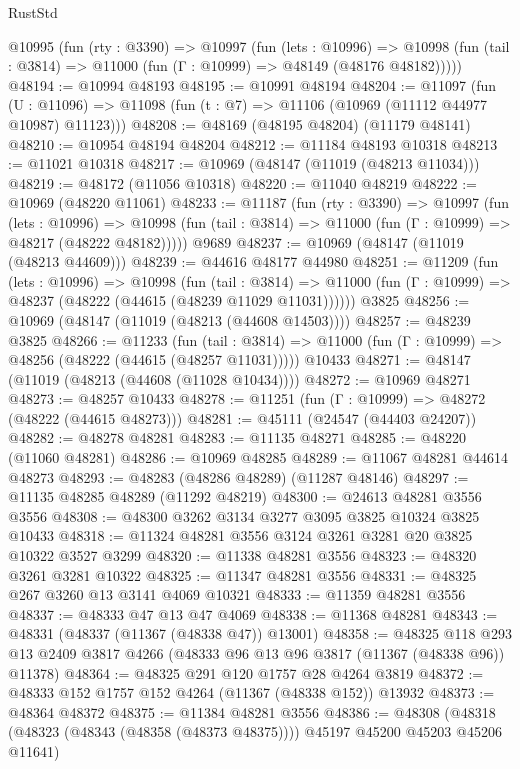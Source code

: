 \begin{lexlean}{RustStd}
\begin{coremodule}
  @10995
    (fun (rty : @3390) =>
    @10997
      (fun (lets : @10996) =>
      @10998 (fun (tail : @3814) => @11000 (fun (Γ : @10999) => @48149 (@48176 @48182)))))
@48194 := @10994 @48193
@48195 := @10991 @48194
@48204 := @11097
    (fun (U : @11096) => @11098 (fun (t : @7) => @11106 (@10969 (@11112 @44977 @10987) @11123)))
@48208 := @48169 (@48195 @48204) (@11179 @48141)
@48210 := @10954 @48194 @48204
@48212 := @11184 @48193 @10318
@48213 := @11021 @10318
@48217 := @10969 (@48147 (@11019 (@48213 @11034)))
@48219 := @48172 (@11056 @10318)
@48220 := @11040 @48219
@48222 := @10969 (@48220 @11061)
@48233 := @11187
    (fun (rty : @3390) =>
    @10997
      (fun (lets : @10996) =>
      @10998 (fun (tail : @3814) => @11000 (fun (Γ : @10999) => @48217 (@48222 @48182)))))
    @9689
@48237 := @10969 (@48147 (@11019 (@48213 @44609)))
@48239 := @44616 @48177 @44980
@48251 := @11209
    (fun (lets : @10996) =>
    @10998
      (fun (tail : @3814) =>
      @11000 (fun (Γ : @10999) => @48237 (@48222 (@44615 (@48239 @11029 @11031))))))
    @3825
@48256 := @10969 (@48147 (@11019 (@48213 (@44608 @14503))))
@48257 := @48239 @3825
@48266 := @11233
    (fun (tail : @3814) => @11000 (fun (Γ : @10999) => @48256 (@48222 (@44615 (@48257 @11031)))))
    @10433
@48271 := @48147 (@11019 (@48213 (@44608 (@11028 @10434))))
@48272 := @10969 @48271
@48273 := @48257 @10433
@48278 := @11251 (fun (Γ : @10999) => @48272 (@48222 (@44615 @48273)))
@48281 := @45111 (@24547 (@44403 @24207))
@48282 := @48278 @48281
@48283 := @11135 @48271
@48285 := @48220 (@11060 @48281)
@48286 := @10969 @48285
@48289 := @11067 @48281 @44614 @48273
@48293 := @48283 (@48286 @48289) (@11287 @48146)
@48297 := @11135 @48285 @48289 (@11292 @48219)
@48300 := @24613 @48281 @3556 @3556
@48308 := @48300 @3262 @3134 @3277 @3095 @3825 @10324 @3825 @10433
@48318 := @11324 @48281 @3556 @3124 @3261 @3281 @20 @3825 @10322 @3527 @3299
@48320 := @11338 @48281 @3556
@48323 := @48320 @3261 @3281 @10322
@48325 := @11347 @48281 @3556
@48331 := @48325 @267 @3260 @13 @3141 @4069 @10321
@48333 := @11359 @48281 @3556
@48337 := @48333 @47 @13 @47 @4069
@48338 := @11368 @48281
@48343 := @48331 (@48337 (@11367 (@48338 @47)) @13001)
@48358 := @48325
    @118
    @293
    @13
    @2409
    @3817
    @4266
    (@48333 @96 @13 @96 @3817 (@11367 (@48338 @96)) @11378)
@48364 := @48325 @291 @120 @1757 @28 @4264 @3819
@48372 := @48333 @152 @1757 @152 @4264 (@11367 (@48338 @152)) @13932
@48373 := @48364 @48372
@48375 := @11384 @48281 @3556
@48386 := @48308
    (@48318 (@48323 (@48343 (@48358 (@48373 @48375)))) @45197 @45200 @45203 @45206 @11641)

\end{coremodule}
\end{lexlean}
